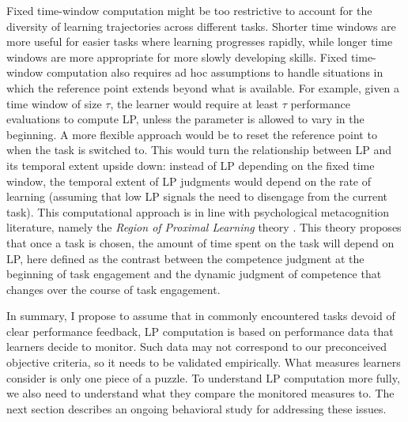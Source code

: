 Fixed time-window computation might be too restrictive to account for the diversity of learning trajectories across different tasks. Shorter time windows are more useful for easier tasks where learning progresses rapidly, while longer time windows are more appropriate for more slowly developing skills. Fixed time-window computation also requires ad hoc assumptions to handle situations in which the reference point extends beyond what is available. For example, given a time window of size $\tau$, the learner would require at least $\tau$ performance evaluations to compute \ac{LP}, unless the parameter is allowed to vary in the beginning. A more flexible approach would be to reset the reference point to when the task is switched to. This would turn the relationship between \ac{LP} and its temporal extent upside down: instead of \ac{LP} depending on the fixed time window, the temporal extent of \ac{LP} judgments would depend on the rate of learning (assuming that low \ac{LP} signals the need to disengage from the current task). This computational approach is in line with psychological metacognition literature, namely the \emph{Region of Proximal Learning} theory \cite{metcalfe_region_2005}. This theory proposes that once a task is chosen, the amount of time spent on the task will depend on \ac{LP}, here defined as the contrast between the competence judgment at the beginning of task engagement and the dynamic judgment of competence that changes over the course of task engagement.

In summary, I propose to assume that in commonly encountered tasks devoid of clear performance feedback, \ac{LP} computation is based on performance data that learners decide to monitor. Such data may not correspond to our preconceived objective criteria, so it needs to be validated empirically. What measures learners consider is only one piece of a puzzle. To understand \ac{LP} computation more fully, we also need to understand what they compare the monitored measures to. The next section describes an ongoing behavioral study for addressing these issues.

